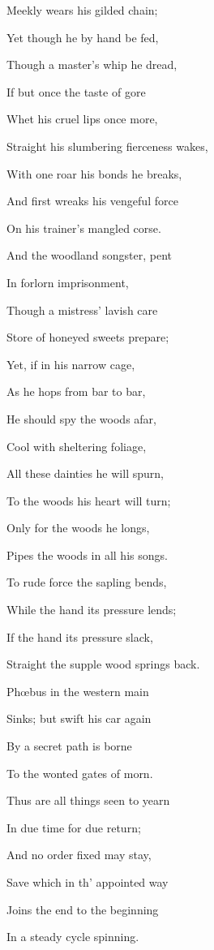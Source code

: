 Meekly wears his gilded chain;

Yet though he by hand be fed,

Though a master's whip he dread,

If but once the taste of gore

Whet his cruel lips once more,

Straight his slumbering fierceness wakes,

With one roar his bonds he breaks,

And first wreaks his vengeful force

On his trainer's mangled corse.

And the woodland songster, pent

In forlorn imprisonment,

Though a mistress' lavish care

Store of honeyed sweets prepare;

Yet, if in his narrow cage,

As he hops from bar to bar,

He should spy the woods afar,

Cool with sheltering foliage,

All these dainties he will spurn,

To the woods his heart will turn;

Only for the woods he longs,

Pipes the woods in all his songs.

To rude force the sapling bends,

While the hand its pressure lends;

If the hand its pressure slack,

Straight the supple wood springs back.

Phœbus in the western main

Sinks; but swift his car again

By a secret path is borne

To the wonted gates of morn.

Thus are all things seen to yearn

In due time for due return;

And no order fixed may stay,

Save which in th' appointed way

Joins the end to the beginning

In a steady cycle spinning.


